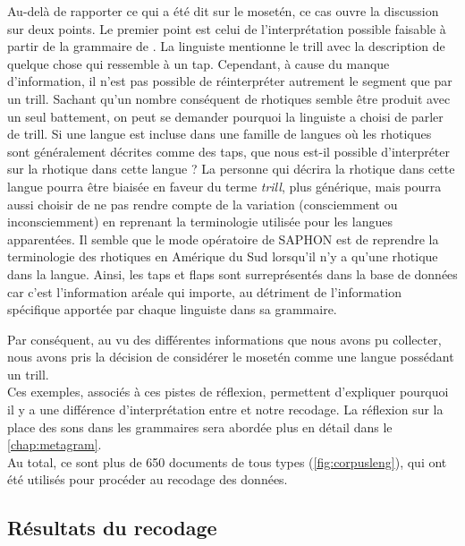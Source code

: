 Au-delà de rapporter ce qui a été dit sur le mosetén, ce cas ouvre la discussion sur deux points. Le premier point est celui de l'interprétation possible faisable à partir de la grammaire de \textcite{sakelGrammarMoseten2004}. La linguiste mentionne le trill avec la description de quelque chose qui ressemble à un tap. Cependant, à cause du manque d'information, il n'est pas possible de réinterpréter autrement le segment que par un trill. Sachant qu'un nombre conséquent de rhotiques semble être produit avec un seul battement, on peut se demander pourquoi la linguiste a choisi de parler de trill.
Si une langue est incluse dans une famille de langues où les rhotiques sont généralement décrites comme des taps, 
que nous est-il possible d'interpréter sur la rhotique dans cette langue ?
La personne qui décrira la rhotique dans cette langue pourra être biaisée en faveur du terme \textit{trill}, plus générique, mais pourra aussi choisir de ne pas rendre compte de la variation (consciemment ou inconsciemment) en reprenant la terminologie utilisée pour les langues apparentées.
Il semble que le mode opératoire de SAPHON est de reprendre la terminologie des rhotiques en Amérique du Sud lorsqu'il n'y a qu'une rhotique dans la langue. Ainsi, les taps et flaps sont surreprésentés dans la base de données car c'est l'information aréale qui importe, au détriment de l'information spécifique apportée par chaque linguiste dans sa grammaire.

Par conséquent, au vu des différentes informations que nous avons pu collecter, nous avons pris la décision de considérer le mosetén comme une langue possédant un trill.\\

Ces exemples, associés à ces pistes de réflexion, permettent d'expliquer pourquoi il y a une différence d'interprétation entre \textcite{winterTrilledAssociatedRoughness2022} et notre recodage. La réflexion sur la place des sons dans les grammaires sera abordée plus en détail dans le \autoref{chap:metagram}.\\


Au total, ce sont plus de 650 documents de tous types %
(\autoref{fig:corpusleng}), qui ont été utilisés pour procéder au recodage des données.

 \subsection{Résultats du recodage}

